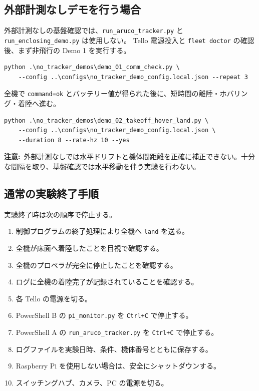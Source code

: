 \documentclass[11pt,a4paper]{ltjsarticle}
\newcommand{\code}[1]{\texttt{\small #1}}
\newcommand{\warning}[1]{\par\smallskip\noindent\textbf{注意:}~#1\par\smallskip}
\begin{document}
\subsection{外部計測なしデモを行う場合}

外部計測なしの基盤確認では、\code{run\_aruco\_tracker.py} と \code{run\_enclosing\_demo.py} は使用しない。
Tello 電源投入と \code{fleet doctor} の確認後、まず非飛行の Demo 1 を実行する。

\begin{lstlisting}
python .\no_tracker_demos\demo_01_comm_check.py \
    --config ..\configs\no_tracker_demo_config.local.json --repeat 3
\end{lstlisting}

全機で \code{command=ok} とバッテリー値が得られた後に、短時間の離陸・ホバリング・着陸へ進む。

\begin{lstlisting}
python .\no_tracker_demos\demo_02_takeoff_hover_land.py \
    --config ..\configs\no_tracker_demo_config.local.json \
    --duration 8 --rate-hz 10 --yes
\end{lstlisting}

\warning{外部計測なしでは水平ドリフトと機体間距離を正確に補正できない。十分な間隔を取り、基盤確認では水平移動を伴う実験を行わない。}

\subsection{通常の実験終了手順}

実験終了時は次の順序で停止する。

\begin{enumerate}[leftmargin=1.6em]
  \item 制御プログラムの終了処理により全機へ \code{land} を送る。
  \item 全機が床面へ着陸したことを目視で確認する。
  \item 全機のプロペラが完全に停止したことを確認する。
  \item ログに全機の着陸完了が記録されていることを確認する。
  \item 各 Tello の電源を切る。
  \item PowerShell B の \code{pi\_monitor.py} を \code{Ctrl+C} で停止する。
  \item PowerShell A の \code{run\_aruco\_tracker.py} を \code{Ctrl+C} で停止する。
  \item ログファイルを実験日時、条件、機体番号とともに保存する。
  \item Raspberry Pi を使用しない場合は、安全にシャットダウンする。
  \item スイッチングハブ、カメラ、PC の電源を切る。
\end{enumerate}
\end{document}
